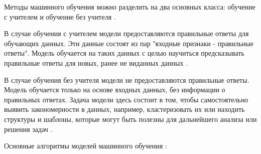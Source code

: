 Методы машинного обучения можно разделить на два основных класса: обучение с учителем и обучение без учителя .

В случае обучения с учителем модели предоставляются правильные ответы для обучающих данных. Эти данные состоят из пар "входные признаки - правильные ответы". Модель обучается на таких данных с целью научиться предсказывать правильные ответы для новых, ранее не виданных данных .

В случае обучения без учителя модели не предоставляются правильные ответы. Модель обучается только на основе входных данных, без информации о правильных ответах. Задача модели здесь состоит в том, чтобы самостоятельно выявить закономерности в данных, например, кластеризовать их или находить структуры и шаблоны, которые могут быть полезны для дальнейшего анализа или решения задач .

Основные алгоритмы моделей машинного обучения :

